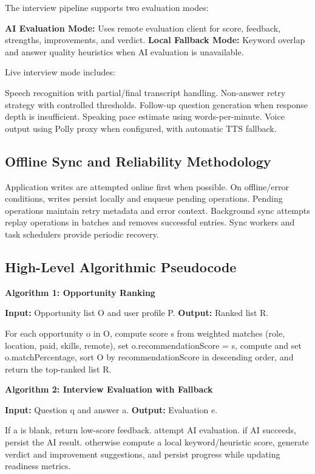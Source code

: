 \documentclass[conference]{IEEEtran}
\begin{document}
The interview pipeline supports two evaluation modes:

\textbf{AI Evaluation Mode:} Uses remote evaluation client for score, feedback, strengths, improvements, and verdict. \textbf{Local Fallback Mode:} Keyword overlap and answer quality heuristics when AI evaluation is unavailable.

Live interview mode includes:

Speech recognition with partial/final transcript handling. Non-answer retry strategy with controlled thresholds. Follow-up question generation when response depth is insufficient. Speaking pace estimate using words-per-minute. Voice output using Polly proxy when configured, with automatic TTS fallback.

\subsection{Offline Sync and Reliability Methodology}

Application writes are attempted online first when possible. On offline/error conditions, writes persist locally and enqueue pending operations. Pending operations maintain retry metadata and error context. Background sync attempts replay operations in batches and removes successful entries. Sync workers and task schedulers provide periodic recovery.

\subsection{High-Level Algorithmic Pseudocode}

\textbf{Algorithm 1: Opportunity Ranking}

\textbf{Input:} Opportunity list O and user profile P. \textbf{Output:} Ranked list R.

For each opportunity o in O, compute score s from weighted matches (role, location, paid, skills, remote), set o.recommendationScore = s, compute and set o.matchPercentage, sort O by recommendationScore in descending order, and return the top-ranked list R.

\textbf{Algorithm 2: Interview Evaluation with Fallback}

\textbf{Input:} Question q and answer a. \textbf{Output:} Evaluation e.

If a is blank, return low-score feedback. attempt AI evaluation. if AI succeeds, persist the AI result. otherwise compute a local keyword/heuristic score, generate verdict and improvement suggestions, and persist progress while updating readiness metrics.
\end{document}
